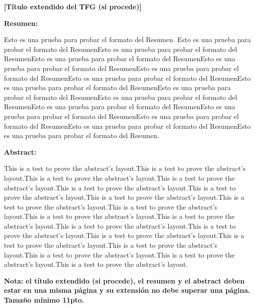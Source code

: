 \documentclass[11pt, a4paper]{article} %
\begin{document}
\newpage

{\bfseries \large [Título extendido del TFG (si procede)] }\vspace{10mm} 





\nocite{*}




{\bfseries \large Resumen:} \vspace{5mm}

Esto es una prueba para probar el formato del Resumen. Esto es una prueba para probar el formato del ResumenEsto es una prueba para probar el formato del ResumenEsto es una prueba para probar el formato del ResumenEsto es una prueba para probar el formato del ResumenEsto es una prueba para probar el formato del ResumenEsto es una prueba para probar el formato del ResumenEsto es una prueba para probar el formato del ResumenEsto es una prueba para probar el formato del ResumenEsto es una prueba para probar el formato del ResumenEsto es una prueba para probar el formato del ResumenEsto es una prueba para probar el formato del ResumenEsto es una prueba para probar el formato del ResumenEsto es una prueba para probar el formato del ResumenEsto es una prueba para probar el formato del Resumen.
\vspace{1cm}

{\bfseries \large Abstract: }\vspace{5mm} 

This is a test to prove the abstract's layout.This is a test to prove the abstract's layout.This is a test to prove the abstract's layout.This is a test to prove the abstract's layout.This is a test to prove the abstract's layout.This is a test to prove the abstract's layout.This is a test to prove the abstract's layout.This is a test to prove the abstract's layout.This is a test to prove the abstract's layout.This is a test to prove the abstract's layout.This is a test to prove the abstract's layout.This is a test to prove the abstract's layout.This is a test to prove the abstract's layout.This is a test to prove the abstract's layout.This is a test to prove the abstract's layout.This is a test to prove the abstract's layout.This is a test to prove the abstract's layout.This is a test to prove the abstract's layout.This is a test to prove the abstract's layout.
\vspace{1cm}

{\Large\textbf{Nota: el título extendido (si procede), el resumen y el abstract deben estar en una misma página y su extensión no debe superar una página. Tamaño mínimo 11pto.}}
\vspace{1cm}
\end{document}

